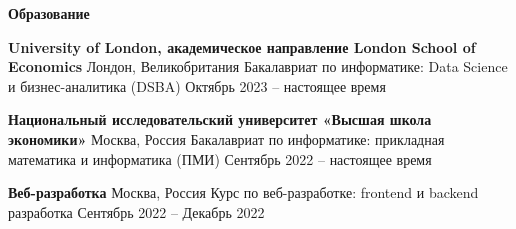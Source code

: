 \begin{center}
    \textbf{Образование}
\end{center}

\textbf{University of London, академическое направление London School of Economics} \hfill Лондон, Великобритания
Бакалавриат по информатике: Data Science и бизнес-аналитика (DSBA) \hfill Октябрь 2023 – настоящее время

\textbf{Национальный исследовательский университет «Высшая школа экономики»} \hfill Москва, Россия
Бакалавриат по информатике: прикладная математика и информатика (ПМИ) \hfill Сентябрь 2022 – настоящее время

\textbf{Веб-разработка} \hfill Москва, Россия
Курс по веб-разработке: frontend и backend разработка \hfill Сентябрь 2022 – Декабрь 2022

